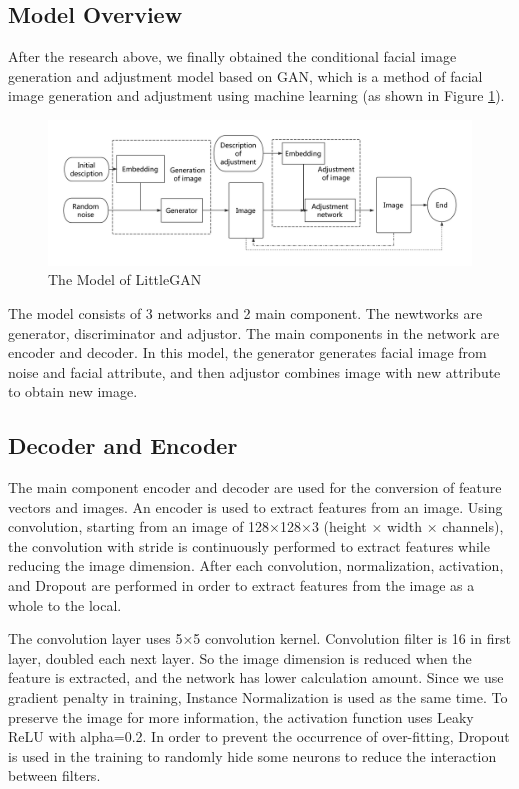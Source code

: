 \subsection{Model Overview}

After the research above, we finally obtained the conditional facial image generation and adjustment model based on GAN,
    which is a method of facial image generation and adjustment using machine learning (as shown in Figure \ref{smliegan}).

\begin{figure}
    \begin{center}
    \includegraphics[width=\textwidth]{figures/model.pdf}
    \caption{The Model of LittleGAN}
    \label{smliegan}
    \end{center}
\end{figure}

The model consists of 3 networks and 2 main component.
The newtworks are generator, discriminator and adjustor.
The main components in the network are encoder and decoder.
In this model, the generator generates facial image from noise and facial attribute,
    and then adjustor combines image with new attribute to obtain new image.


\subsection{Decoder and Encoder}

The main component encoder and decoder are used for the conversion of feature vectors and images.
An encoder is used to extract features from an image.
Using convolution, starting from an image of 128×128×3 (height × width × channels),
    the convolution with stride is continuously performed to extract features while reducing the image dimension.
After each convolution,
    normalization, activation, and Dropout are performed in order to extract features from the image as a whole to the local.

The convolution layer uses 5×5 convolution kernel.
Convolution filter is 16 in first layer, doubled each next layer.
So the image dimension is reduced when the feature is extracted,
    and the network has lower calculation amount.
Since we use gradient penalty in training,
    Instance Normalization is used as the same time.
To preserve the image for more information, the activation function uses Leaky ReLU with alpha=0.2.
In order to prevent the occurrence of over-fitting,
    Dropout is used in the training to randomly hide some neurons to reduce the interaction between filters.

